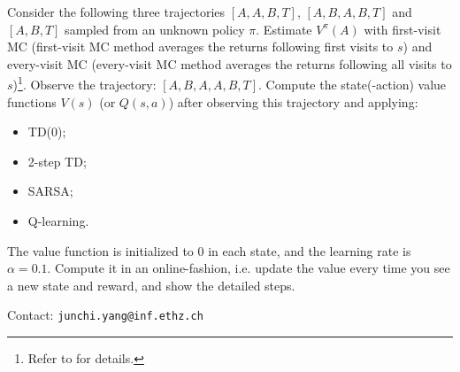 \begin{questions}
    \question[10]  Consider the following three trajectories $[A, A, B, T]$, $[A, B, A, B, T]$ and $[A, B, T]$ sampled from an unknown policy $\pi$. Estimate $V^\pi(A)$ with first-visit MC (first-visit MC method  averages the returns following first visits to $s$) and every-visit MC (every-visit MC method averages the returns following all visits to $s$)\footnote{Refer to \cite[Section 5.1]{sutton2018reinforcement} for details.}.
    \question[10] Observe the trajectory: $[A, B, A, A, B, T]$. Compute the state(-action) value functions $V(s)$ (or $Q(s, a)$) after observing this trajectory and applying:
    \begin{itemize}
        \item TD(0);
        \item 2-step TD;
        \item SARSA;
        \item Q-learning.
    \end{itemize}
    The value function is initialized to $0$ in each state, and the learning rate is $\alpha = 0.1$. Compute it in an online-fashion, i.e. update the value every time you see a new state and reward, and show the detailed steps. 
\end{questions}



Contact: \texttt{junchi.yang@inf.ethz.ch}

